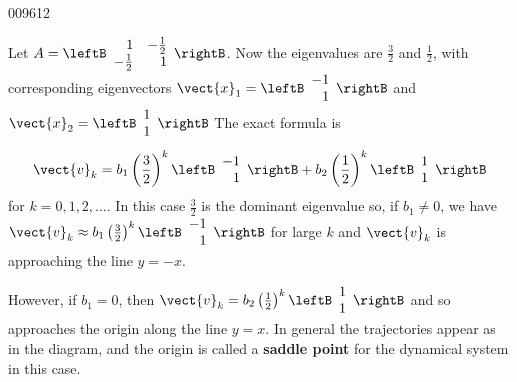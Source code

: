 \begin{example}{}{009612}
\begin{wrapfigure}[12]{l}{5cm}
\centering

\end{wrapfigure}
\setlength{\rightskip}{0pt plus 200pt}
Let $A = \leftB \begin{array}{rr}
1 & -\frac{1}{2} \\
-\frac{1}{2} & 1 
\end{array}\rightB$. Now the eigenvalues are $\frac{3}{2}$
 and $\frac{1}{2}$, with corresponding eigenvectors $\vect{x}_1 = \leftB \begin{array}{r}
-1 \\
1
\end{array}\rightB$
 and $\vect{x}_2 = \leftB \begin{array}{r}
1 \\
1
\end{array}\rightB$
 The exact formula is
\begin{equation*}
\vect{v}_k = b_1 \left( \frac{3}{2} \right)^k \leftB \begin{array}{r}
-1 \\
1
\end{array}\rightB + b_2 \left( \frac{1}{2} \right)^k \leftB \begin{array}{r}
1 \\
1
\end{array}\rightB
\end{equation*}
for $k = 0, 1, 2, \dots$. In this case $\frac{3}{2}$
 is the dominant eigenvalue so, if $b_{1} \neq 0$, we have $\vect{v}_k \approx b_1 \left( \frac{3}{2} \right)^k \leftB \begin{array}{r}
-1 \\
1
\end{array}\rightB$
 for large $k$ and $\vect{v}_{k}$ is approaching the line $y = -x$.

However, if $b_{1} = 0$, then $\vect{v}_k = b_2 \left( \frac{1}{2} \right)^k \leftB \begin{array}{r}
1 \\
1
\end{array}\rightB$
 and so approaches the origin along the line $y = x$. In general the trajectories appear as in the diagram, and the origin is called a \textbf{saddle point} for the dynamical system in this case.
\end{example}


